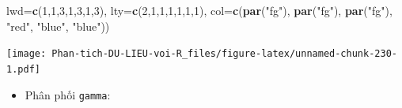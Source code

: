 \documentclass[
]{book}
\newenvironment{Shaded}{\begin{snugshade}}{\end{snugshade}}
\newcommand{\DataTypeTok}[1]{\textcolor[rgb]{0.13,0.29,0.53}{#1}}
\newcommand{\DecValTok}[1]{\textcolor[rgb]{0.00,0.00,0.81}{#1}}
\newcommand{\KeywordTok}[1]{\textcolor[rgb]{0.13,0.29,0.53}{\textbf{#1}}}
\newcommand{\NormalTok}[1]{#1}
\newcommand{\StringTok}[1]{\textcolor[rgb]{0.31,0.60,0.02}{#1}}
\providecommand{\tightlist}{%
  \setlength{\itemsep}{0pt}\setlength{\parskip}{0pt}}
\begin{document}
\begin{Shaded}
\begin{Highlighting}[]
         \DataTypeTok{lwd=}\KeywordTok{c}\NormalTok{(}\DecValTok{1}\NormalTok{,}\DecValTok{1}\NormalTok{,}\DecValTok{3}\NormalTok{,}\DecValTok{1}\NormalTok{,}\DecValTok{3}\NormalTok{,}\DecValTok{1}\NormalTok{,}\DecValTok{3}\NormalTok{), }
         \DataTypeTok{lty=}\KeywordTok{c}\NormalTok{(}\DecValTok{2}\NormalTok{,}\DecValTok{1}\NormalTok{,}\DecValTok{1}\NormalTok{,}\DecValTok{1}\NormalTok{,}\DecValTok{1}\NormalTok{,}\DecValTok{1}\NormalTok{,}\DecValTok{1}\NormalTok{), }
         \DataTypeTok{col=}\KeywordTok{c}\NormalTok{(}\KeywordTok{par}\NormalTok{(}\StringTok{"fg"}\NormalTok{), }\KeywordTok{par}\NormalTok{(}\StringTok{"fg"}\NormalTok{), }\KeywordTok{par}\NormalTok{(}\StringTok{"fg"}\NormalTok{), }
               \StringTok{"red"}\NormalTok{, }\StringTok{"blue"}\NormalTok{, }\StringTok{"blue"}\NormalTok{)) }
\end{Highlighting}
\end{Shaded}

\texttt{[image: Phan-tich-DU-LIEU-voi-R\_files/figure-latex/unnamed-chunk-230-1.pdf]}

\begin{itemize}
\tightlist
\item
  Phân phối \texttt{gamma}:
\end{itemize}
\end{document}
